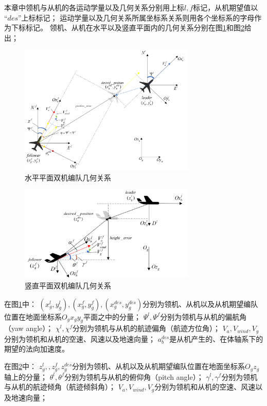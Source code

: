 本章中领机与从机的各运动学量以及几何关系分别用上标$l,f$标记，从机期望值以$“des”$上标标记；
运动学量以及几何关系所属坐标系关系则用各个坐标系的字母作为下标标记。
领机、从机在水平以及竖直平面内的几何关系分别在图\ref{fig:c02-2d_level_motion}和图\ref{fig:c02-2d_vert_motion}给出；
\begin{figure}[H]
    \centering
    \includegraphics[width=0.75\textwidth]{figures/c2/2d_level_motion.png}
    \caption{水平平面双机编队几何关系}\label{fig:c02-2d_level_motion}
\end{figure}
\begin{figure}[H]
    \centering
    \includegraphics[width=0.75\textwidth]{figures/c2/2d_vert_motion.png}
    \caption{竖直平面双机编队几何关系}\label{fig:c02-2d_vert_motion}
\end{figure}
在图\ref{fig:c02-2d_level_motion}中：
$(x_{g}^l,y_{g}^l),(x_{g}^f,y_{g}^f),(x_{g}^{des},y_{g}^{des})$分别为领机、从机以及从机期望编队位置在地面坐标系$O_gx_gy_g$平面之中的分量；
$\Psi^l,\Psi^f$分别为领机与从机的偏航角（yaw angle）；
$\chi^l,\chi^f$分别为领机与从机的航迹偏角（航迹方位角）；
$V_a,V_{wind},V_g$分别为领机和从机的空速、风速以及地速向量；
$a_{b}^{des}$是从机产生的、在体轴系下的期望的法向加速度。

在图\ref{fig:c02-2d_vert_motion}中：
$z_{g}^l,,z_{g}^f,z_{g}^{des}$分别为领机、从机以及从机期望编队位置在地面坐标系$O_gz_g$轴上的分量；
$\theta^l,\theta^f$分别为领机与从机的俯仰角（pitch angle）；
$\gamma^l,\gamma^f$分别为领机与从机的航迹倾角（航迹倾斜角）；
$V_a,V_{wind},V_g$分别为领机和从机的空速、风速以及地速向量；

